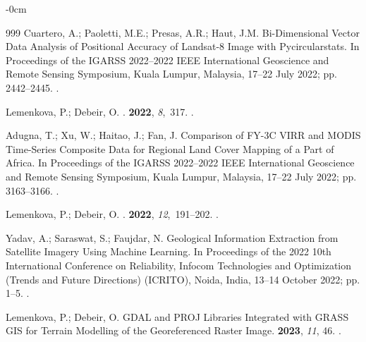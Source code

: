 \documentclass[jmse,article,accept,pdftex,moreauthors]{Definitions/mdpi}
\begin{document}
\begin{adjustwidth}{-\extralength}{0cm}
\begin{thebibliography}{999}
Cuartero, A.; Paoletti, M.E.; Presas, A.R.; Haut, J.M.
\newblock Bi-Dimensional Vector Data Analysis of Positional Accuracy of
  Landsat-8 Image with Pycircularstats.
\newblock In Proceedings of the IGARSS 2022--2022 IEEE International
  Geoscience and Remote Sensing Symposium, Kuala Lumpur, Malaysia,  17--22 July 2022; pp. 2442--2445.
.%

Lemenkova, P.; Debeir, O.
.
 {\bf 2022}, {\em 8},~317.
.

Adugna, T.; Xu, W.; Haitao, J.; Fan, J.
\newblock Comparison of FY-3C VIRR and MODIS Time-Series Composite Data for
  Regional Land Cover Mapping of a Part of Africa.
\newblock In Proceedings of the IGARSS 2022--2022 IEEE International
  Geoscience and Remote Sensing Symposium, Kuala Lumpur, Malaysia, 17--22 July 2022;  pp. 3163--3166.
. %

Lemenkova, P.; Debeir, O.
.
 {\bf 2022}, {\em 12},~191--202.
.

Yadav, A.; Saraswat, S.; Faujdar, N.
\newblock Geological Information Extraction from Satellite Imagery Using
  Machine Learning.
\newblock In Proceedings of the 2022 10th International Conference on
  Reliability, Infocom Technologies and Optimization (Trends and Future
  Directions) (ICRITO), Noida, India, 13--14 October 2022; pp. 1--5. %
.

Lemenkova, P.; Debeir, O.
\newblock GDAL and PROJ Libraries Integrated with GRASS GIS for Terrain
  Modelling of the Georeferenced Raster Image.
 {\bf 2023}, {\em 11}, 46.
.


\end{thebibliography}
\end{adjustwidth}
\end{document}
